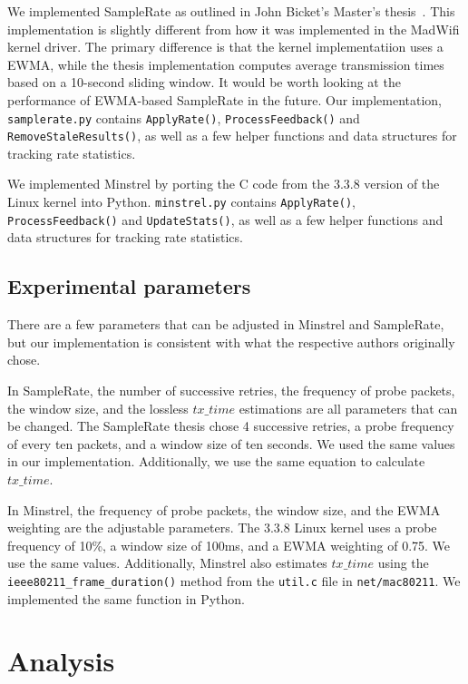 \documentclass[twocolumn,10pt]{article}
\begin{document}
We implemented SampleRate as outlined in John Bicket's Master's
thesis~\cite{samplerate}.  This implementation is slightly different
from how it was implemented in the MadWifi kernel driver.  The primary
difference is that the kernel implementatiion uses a EWMA, while the
thesis implementation computes average transmission times based on a
10-second sliding window.  It would be worth looking at the
performance of EWMA-based SampleRate in the future.  Our
implementation, \texttt{samplerate.py} contains \texttt{ApplyRate()},
\texttt{ProcessFeedback()} and \texttt{RemoveStaleResults()}, as well
as a few helper functions and data structures for tracking rate
statistics.

We implemented Minstrel by porting the C code from the 3.3.8 version
of the Linux kernel into Python.  \texttt{minstrel.py} contains
\texttt{ApplyRate()}, \texttt{ProcessFeedback()} and
\texttt{UpdateStats()}, as well as a few helper functions and data
structures for tracking rate statistics.

\subsection{Experimental parameters}

There are a few parameters that can be adjusted in Minstrel and
SampleRate, but our implementation is consistent with what the
respective authors originally chose.

In SampleRate, the number of successive retries, the frequency of
probe packets, the window size, and the lossless $tx\_time$
estimations are all parameters that can be changed.  The SampleRate
thesis chose 4 successive retries, a probe frequency of every ten
packets, and a window size of ten seconds.  We used the same values in
our implementation.  Additionally, we use the same equation to
calculate $tx\_time$.

In Minstrel, the frequency of probe packets, the window size, and the
EWMA weighting are the adjustable parameters.  The 3.3.8 Linux kernel
uses a probe frequency of 10\%, a window size of 100ms, and a EWMA
weighting of 0.75.  We use the same values.  Additionally, Minstrel
also estimates $tx\_time$ using the \verb|ieee80211_frame_duration()|
method from the \texttt{util.c} file in \texttt{net/mac80211}.  We
implemented the same function in Python.


\section{Analysis} \label{sec:analysis}
\end{document}
